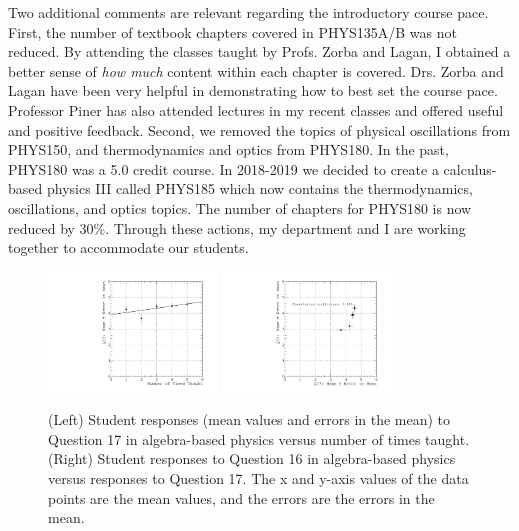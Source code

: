 \documentclass[../../main.tex]{subfiles}
\begin{document}
Two additional comments are relevant regarding the introductory course pace.  First, the number of textbook chapters covered in PHYS135A/B was not reduced.  By attending the classes taught by Profs. Zorba and Lagan, I obtained a better sense of \textit{how much} content within each chapter is covered.  Drs. Zorba and Lagan have been very helpful in demonstrating how to best set the course pace.  Professor Piner has also attended lectures in my recent classes and offered useful and positive feedback.  Second, we removed the topics of physical oscillations from PHYS150, and thermodynamics and optics from PHYS180.  In the past, PHYS180 was a 5.0 credit course.  In 2018-2019 we decided to create a calculus-based physics III called PHYS185 which now contains the thermodynamics, oscillations, and optics topics.  The number of chapters for PHYS180 is now reduced by 30\%.  Through these actions, my department and I are working together to accommodate our students.  \\ \hspace{0.1cm}

\begin{figure}[h]
\centering
\includegraphics[width=0.4\textwidth]{Q17_algebra_based.pdf}
\includegraphics[width=0.4\textwidth]{Q16_Q17_algebra_based.pdf}
\caption{\label{fig:courses:intro_q17}  (Left) Student responses (mean values and errors in the mean) to Question 17 in algebra-based physics versus number of times taught. (Right) Student responses to Question 16 in algebra-based physics versus responses to Question 17.  The x and y-axis values of the data points are the mean values, and the errors are the errors in the mean.}
\end{figure}
\end{document}
